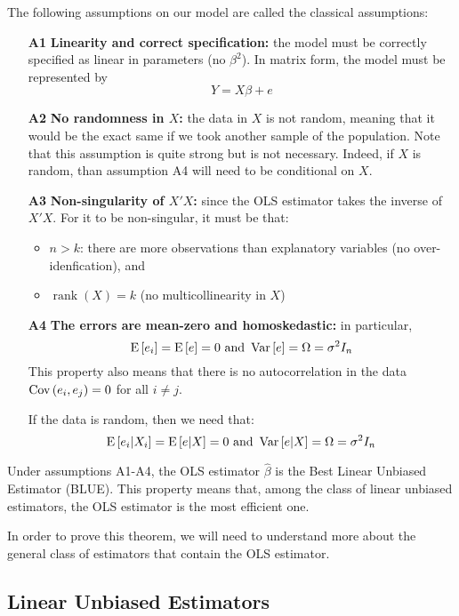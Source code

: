 \begin{definition}
The following assumptions on our model are called the classical assumptions:
\begin{itemize}
\item[\textbf{A1}]\textbf{Linearity and correct specification:} the model must be correctly specified as linear in parameters (no $\beta^2$). In matrix form, the model must be represented by $$Y = X\beta + e$$
\item[\textbf{A2}]\textbf{No randomness in $X$:} the data in $X$ is not random, meaning that it would be the exact same if we took another sample of the population. Note that this assumption is quite strong but is not necessary. Indeed, if $X$ is random, than assumption A4 will need to be conditional on $X$.
\item[\textbf{A3}]\textbf{Non-singularity of $X'X$:} since the OLS estimator takes the inverse of $X'X$. For it to be non-singular, it must be that:\begin{itemize}
\item $n>k$: there are more observations than explanatory variables (no over-idenfication), and
\item $\operatorname{rank}(X) = k$ (no multicollinearity in $X$)
\end{itemize}
\item[\textbf{A4}]\textbf{The errors are mean-zero and homoskedastic:} in particular, $$ \operatorname{E}\left[e_i\right] = \operatorname{E}\left[e\right] = 0 \text{ and } \operatorname{Var}\left[e\right] = \Omega = \sigma^2I_n $$
This property also means that there is no autocorrelation in the data $\operatorname{Cov}\left(e_i, e_j\right) = 0$ for all $i\neq j$.

If the data is random, then we need that: $$ \operatorname{E}\left[e_i|X_i\right] = \operatorname{E}\left[e|X\right] = 0 \text{ and } \operatorname{Var}\left[e|X\right] = \Omega = \sigma^2I_n $$
\end{itemize}
\end{definition}

\begin{theorem}
Under assumptions A1-A4, the OLS estimator $\hat\beta$ is the Best Linear Unbiased Estimator (BLUE). This property means that, among the class of linear unbiased estimators, the OLS estimator is the most efficient one.
\end{theorem}

In order to prove this theorem, we will need to understand more about the general class of estimators that contain the OLS estimator.

\subsection{Linear Unbiased Estimators}

